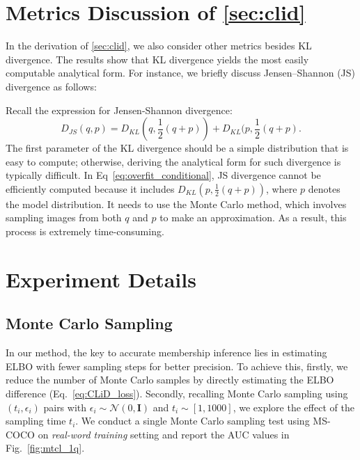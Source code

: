 \documentclass{article}
\theoremstyle{plain}
\theoremstyle{remark}
\begin{document}
\section{Metrics Discussion of \cref{sec:clid} }\label{appd:other_metric}
In the derivation of \cref{sec:clid}, we also consider other metrics besides KL divergence. The results show that KL divergence yields the most easily computable analytical form. For instance, we briefly discuss Jensen–Shannon (JS) divergence as follows:

Recall the expression for Jensen-Shannon divergence:
\begin{equation}
    D_{JS}(q, p) = D_{KL}(q, \frac{1}{2}(q+ p)) + D_{KL}(p, \frac{1}{2}(q + p). 
\end{equation}
The first parameter of the KL divergence should be a simple distribution that is easy to compute; otherwise, deriving the analytical form for such divergence is typically difficult. 
In Eq~\eqref{eq:overfit_conditional}, JS divergence cannot be efficiently computed because it includes \(D_{KL}(p, \frac{1}{2}(q + p))\), where $p$ denotes the model distribution.
It needs to use the Monte Carlo method, which involves sampling images from both \(q\) and \(p\) to make an approximation. As a result,  this process is extremely time-consuming.



\section{Experiment Details}\label{appd:detail}

\subsection{Monte Carlo Sampling}


In our method, the key to accurate membership inference lies in estimating ELBO with fewer sampling steps for better precision.
To achieve this, firstly, we reduce the number of Monte Carlo samples by directly estimating the ELBO difference (Eq.~\eqref{eq:CLiD_loss}). Secondly, recalling Monte Carlo sampling using $(t_i, \epsilon_i)$ pairs with $\epsilon_i \sim \mathcal{N}(0,\mathbf{I})$ and  $t_i \sim [1,1000] $, we explore the effect of the sampling time $t_i$. 
We conduct a single Monte Carlo sampling test using MS-COCO on \textit{real-word training} setting and report the AUC values in Fig.~\ref{fig:mtcl_1q}.
\end{document}
